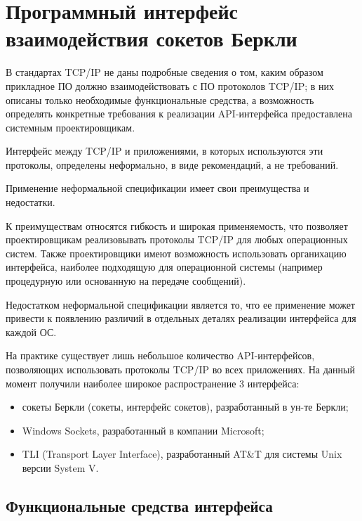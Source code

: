 \chapter{Программный интерфейс взаимодействия сокетов Беркли}

В стандартах TCP/IP не даны подробные сведения о том,  каким образом прикладное ПО должно взаимодействовать с ПО протоколов TCP/IP; в них описаны только необходимые функциональные средства,  а возможность определять конкретные требования к реализации API-интерфейса предоставлена системным проектировщикам.

Интерфейс между TCP/IP и приложениями,  в которых используются эти протоколы,  определены неформально,  в виде рекомендаций,  а не требований.

Применение неформальной спецификации имеет свои преимущества и недостатки.

К преимуществам относятся гибкость и широкая применяемость,  что позволяет проектировщикам реализовывать протоколы TCP/IP для любых операционных систем. Также проектировщики имеют возможность использовать органихацию интерфейса,  наиболее подходящую для операционной системы (например процедурную или основанную на передаче сообщений).

Недостатком неформальной спецификации является то,  что ее применение может привести к появлению различий в отдельных деталях реализации интерфейса для каждой ОС. 

На практике существует лишь небольшое количество API-интерфейсов, позволяющих использовать протоколы TCP/IP во всех приложениях. На данный момент получили наиболее широкое распространение 3 интерфейса: 
\begin{itemize}
\item сокеты Беркли (сокеты,  интерфейс сокетов),  разработанный в ун-те Беркли; 
\item Windows Sockets, разработанный в компании Microsoft;
\item TLI (Transport Layer Interface), разработанный AT\&T для системы Unix версии System V.
\end{itemize}

\section{Функциональные средства интерфейса}

